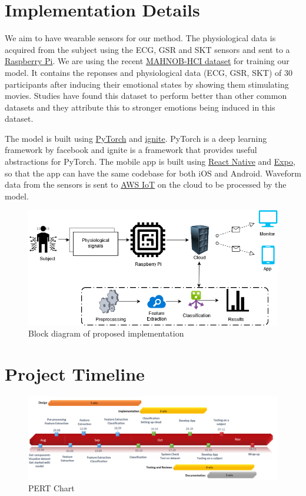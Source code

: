 \documentclass[11pt]{article}
\theoremstyle{definition}
\begin{document}
  \section{Implementation Details}
    We aim to have wearable sensors for our method. The physiological data is acquired from the subject using the ECG, GSR and SKT sensors and sent to a  \href{https://www.raspberrypi.org/}{Raspberry Pi}. We are using the recent \href{https://mahnob-db.eu/hci-tagging/}{ MAHNOB-HCI dataset}\cite{soleymani_multimodal_2012} for training our model. It contains the reponses and physiological data (ECG, GSR, SKT) of 30 participants after inducing their emotional states by showing them stimulating movies. 
    Studies have found this dataset to perform better than other common datasets and they attribute this to stronger emotions being induced in this dataset\cite{simon_selection_2016}.

    The model is built using \href{https://github.com/pytorch/pytorch}{PyTorch} and \href{https://github.com/pytorch/ignite}{ignite}. PyTorch is a deep learning framework by facebook and ignite is a framework that provides useful abstractions for PyTorch. The mobile app is built using \href{https://facebook.github.io/react-native/}{React Native} and \href{https://expo.io/}{Expo}, so that the app can have the same codebase for both iOS and Android. Waveform data from the sensors is sent to \href{https://aws.amazon.com/iot/}{AWS IoT} on the cloud to be processed by the model.

    \begin{figure}[h]
      \centering
      \includegraphics[scale=0.6]{schematic}
      \caption{Block diagram of proposed implementation}
    \end{figure}
    
  \newpage
  \section{Project Timeline}
    \begin{figure}[h]
      \centering
      \includegraphics[width=\textwidth, scale=1.5]{pert_chart}
      \caption{PERT Chart}
    \end{figure}
  
  
  
\end{document}
